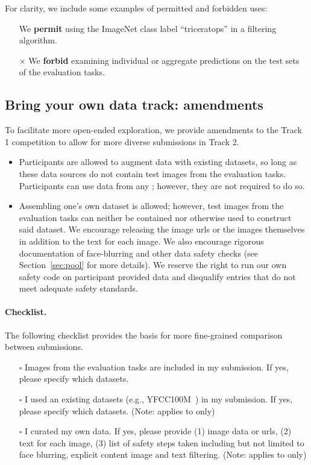 For clarity, we include some examples of permitted and forbidden uses:
\begin{itemize}
\itemsep0em 
\item[\checkmark] We \textbf{permit} using the ImageNet class label ``triceratops'' in a filtering algorithm.
\item[$\times$] We \textbf{forbid} examining individual or aggregate predictions on the test sets of the evaluation tasks.
\end{itemize}

\subsection{Bring your own data track: amendments}
To facilitate more open-ended exploration, we provide amendments to the Track 1 competition to allow for more diverse submissions in Track 2.
\begin{itemize}
    \itemsep0em 
    \item Participants are allowed to augment \pool data with existing datasets, so long as these data sources do not contain test images from the evaluation tasks. Participants can use data from any \pool; however, they are not required to do so.
    \item Assembling one's own dataset is allowed; however, test images from the evaluation tasks can neither be contained nor otherwise used to construct said dataset. We encourage releasing the image urls or the images themselves in addition to the text for each image. We also encourage rigorous documentation of face-blurring and other data safety checks (see Section~\ref{sec:pool} for more details). We reserve the right to run our own safety code on participant provided data and disqualify entries that do not meet adequate safety standards.
\end{itemize}


\paragraph{Checklist.}
The following checklist provides the basis for more fine-grained comparison between submissions. 
\begin{itemize}
    \item[$\square$] Images from the evaluation tasks are included in my submission. If yes, please specify which datasets.
    \item[$\square$] I used an existing datasets (e.g., YFCC100M~\cite{yfcc100m}) in my submission. If yes, please specify which datasets. (Note: applies to \byod only)
    \item[$\square$] I curated my own data. If yes, please provide (1) image data or urls, (2) text for each image, (3) list of safety steps taken including but not limited to face blurring, explicit content image and text filtering. (Note: applies to \byod only)
\end{itemize}

